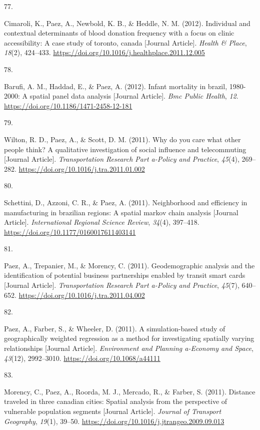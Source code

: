 \documentclass[11pt,a4paper,]{awesome-cv}
\newlength{\csllabelwidth}
\newcommand{\CSLLeftMargin}[1]{\parbox[t]{\csllabelwidth}{#1}}
\newcommand{\CSLRightInline}[1]{\parbox[t]{\linewidth - \csllabelwidth}{#1}}
\begin{document}
\leavevmode{}%
\CSLLeftMargin{77. }
\CSLRightInline{Cimaroli, K., Paez, A., Newbold, K. B., \& Heddle, N. M.
(2012). Individual and contextual determinants of blood donation
frequency with a focus on clinic accessibility: A case study of toronto,
canada {[}Journal Article{]}. \emph{Health \& Place}, \emph{18}(2),
424--433. \url{https://doi.org/10.1016/j.healthplace.2011.12.005}}

\leavevmode{}%
\CSLLeftMargin{78. }
\CSLRightInline{Barufi, A. M., Haddad, E., \& Paez, A. (2012). Infant
mortality in brazil, 1980-2000: A spatial panel data analysis {[}Journal
Article{]}. \emph{Bmc Public Health}, \emph{12}.
\url{https://doi.org/10.1186/1471-2458-12-181}}

\leavevmode{}%
\CSLLeftMargin{79. }
\CSLRightInline{Wilton, R. D., Paez, A., \& Scott, D. M. (2011). Why do
you care what other people think? A qualitative investigation of social
influence and telecommuting {[}Journal Article{]}. \emph{Transportation
Research Part a-Policy and Practice}, \emph{45}(4), 269--282.
\url{https://doi.org/10.1016/j.tra.2011.01.002}}

\leavevmode{}%
\CSLLeftMargin{80. }
\CSLRightInline{Schettini, D., Azzoni, C. R., \& Paez, A. (2011).
Neighborhood and efficiency in manufacturing in brazilian regions: A
spatial markov chain analysis {[}Journal Article{]}. \emph{International
Regional Science Review}, \emph{34}(4), 397--418.
\url{https://doi.org/10.1177/0160017611403141}}

\leavevmode{}%
\CSLLeftMargin{81. }
\CSLRightInline{Paez, A., Trepanier, M., \& Morency, C. (2011).
Geodemographic analysis and the identification of potential business
partnerships enabled by transit smart cards {[}Journal Article{]}.
\emph{Transportation Research Part a-Policy and Practice}, \emph{45}(7),
640--652. \url{https://doi.org/10.1016/j.tra.2011.04.002}}

\leavevmode{}%
\CSLLeftMargin{82. }
\CSLRightInline{Paez, A., Farber, S., \& Wheeler, D. (2011). A
simulation-based study of geographically weighted regression as a method
for investigating spatially varying relationships {[}Journal Article{]}.
\emph{Environment and Planning a-Economy and Space}, \emph{43}(12),
2992--3010. \url{https://doi.org/10.1068/a44111}}

\leavevmode{}%
\CSLLeftMargin{83. }
\CSLRightInline{Morency, C., Paez, A., Roorda, M. J., Mercado, R., \&
Farber, S. (2011). Distance traveled in three canadian cities: Spatial
analysis from the perspective of vulnerable population segments
{[}Journal Article{]}. \emph{Journal of Transport Geography},
\emph{19}(1), 39--50.
\url{https://doi.org/10.1016/j.jtrangeo.2009.09.013}}
\end{document}
